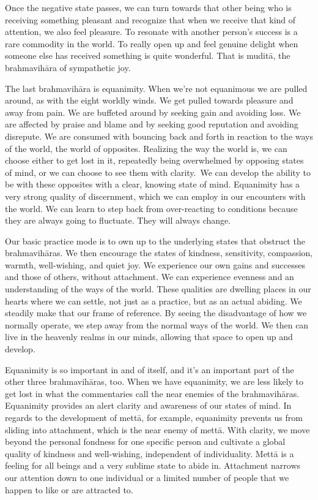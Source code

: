 Once the negative state passes, we can turn towards that other being who is receiving something pleasant and recognize that when we receive that kind of attention, we also feel pleasure. To resonate with another person's success is a rare commodity in the world. To really open up and feel genuine delight when someone else has received something is quite wonderful. That is muditā, the brahmavihāra of sympathetic joy.

The last brahmavihāra is equanimity. When we're not equanimous we are pulled around, as with the eight worldly winds. We get pulled towards pleasure and away from pain. We are buffeted around by seeking gain and avoiding loss. We are affected by praise and blame and by seeking good reputation and avoiding disrepute. We are consumed with bouncing back and forth in reaction to the ways of the world, the world of opposites. Realizing the way the world is, we can choose either to get lost in it, repeatedly being overwhelmed by opposing states of mind, or we can choose to see them with clarity.~We can develop the ability to be with these opposites with a clear, knowing state of mind. Equanimity has a very strong quality of discernment, which we can employ in our encounters with the world. We can learn to step back from over-reacting to conditions because they are always going to fluctuate. They will always change.~

Our basic practice mode is to own up to the underlying states that obstruct the brahmavihāras. We then encourage the states of kindness, sensitivity, compassion, warmth, well-wishing, and quiet joy. We experience our own gains and successes and those of others, without attachment. We can experience evenness and an understanding of the ways of the world. These qualities are dwelling places in our hearts where we can settle, not just as a practice, but as an actual abiding. We steadily make that our frame of reference. By seeing the disadvantage of how we normally operate, we step away from the normal ways of the world. We then can live in the heavenly realms in our minds, allowing that space to open up and develop.~

Equanimity is so important in and of itself, and it's an important part of the other three brahmavihāras, too. When we have equanimity, we are less likely to get lost in what the commentaries call the near enemies of the brahmavihāras. Equanimity provides an alert clarity and awareness of our states of mind. In regards to the development of mettā, for example, equanimity prevents us from sliding into attachment, which is the near enemy of mettā. With clarity, we move beyond the personal fondness for one specific person and cultivate a global quality of kindness and well-wishing, independent of individuality. Mettā is a feeling for all beings and a very sublime state to abide in. Attachment narrows our attention down to one individual or a limited number of people that we happen to like or are attracted to.~

